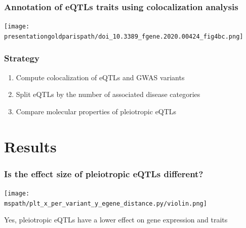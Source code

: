 \documentclass{beamer}
\newcommand*{\presentationgoldparispath}{../presentation_230120_gold2022_paris/fig/}%
\newcommand*{\mspath}{../../out/gwas417/pval_5e-08/r2_0.1/kb_1000/window_1000000/75_50}%
\begin{document}
    \begin{frame}
        \frametitle{Annotation of eQTLs traits using colocalization analysis}

        \begin{center}
            \texttt{[image: \\presentationgoldparispath/doi\_10.3389\_fgene.2020.00424\_fig4bc.png]}
        \end{center}

        \let\thefootnote\relax{}
    \end{frame}

    \begin{frame}
        \frametitle{Strategy}

        \begin{enumerate}
            \item Compute colocalization of eQTLs and GWAS variants
            \item Split eQTLs by the number of associated disease categories
            \item Compare molecular properties of pleiotropic eQTLs
        \end{enumerate}

    \end{frame}


    \section{Results} %

    \begin{frame}
        \frametitle{Is the effect size of pleiotropic eQTLs different?}

        \begin{center}
            \texttt{[image: \\mspath/plt\_x\_per\_variant\_y\_egene\_distance.py/violin.png]}
        \end{center}
        \vfill
        Yes, pleiotropic eQTLs have a lower effect on gene expression and traits

    \end{frame}
\end{document}
